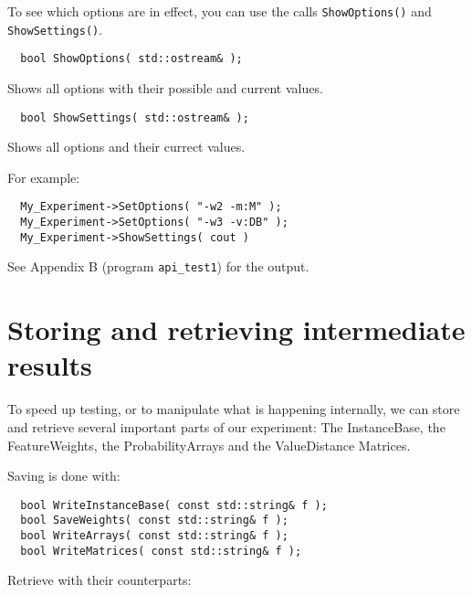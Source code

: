 \documentclass{report}
\begin{document}
To see which options are in effect, you can use the calls {\tt ShowOptions()}
and {\tt ShowSettings()}.

\begin{footnotesize}
\begin{verbatim}
  bool ShowOptions( std::ostream& );
\end{verbatim}
\end{footnotesize}

Shows all options with their possible and current values.

\begin{footnotesize}
\begin{verbatim}
  bool ShowSettings( std::ostream& );
\end{verbatim}
\end{footnotesize}

Shows all options and their currect values.

For example:

\begin{footnotesize}
\begin{verbatim}
  My_Experiment->SetOptions( "-w2 -m:M" );
  My_Experiment->SetOptions( "-w3 -v:DB" );
  My_Experiment->ShowSettings( cout )
\end{verbatim}
\end{footnotesize}

See Appendix B (program {\tt api\_test1}) for the output.

\section{Storing and retrieving intermediate results}

To speed up testing, or to manipulate what is happening internally, we
can store and retrieve several important parts of our experiment: The
InstanceBase, the FeatureWeights, the ProbabilityArrays and the ValueDistance Matrices.

Saving is done with:

\begin{footnotesize}
\begin{verbatim}
  bool WriteInstanceBase( const std::string& f );
  bool SaveWeights( const std::string& f );
  bool WriteArrays( const std::string& f );
  bool WriteMatrices( const std::string& f );
\end{verbatim}
\end{footnotesize}

Retrieve with their counterparts:
\end{document}
